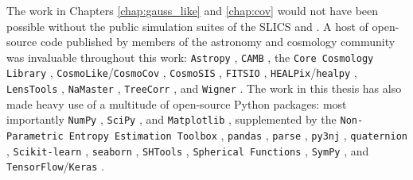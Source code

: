 The work in Chapters \ref{chap:gauss_like} and \ref{chap:cov} would not have been possible without the public simulation suites of the SLICS \citep{Harnois-Deraps2015, Harnois-Deraps2018} and \citet{Takahashi2017}. A host of open-source code published by members of the astronomy and cosmology community was invaluable throughout this work:
%
%
%
%
%
\texttt{Astropy} \citep{TheAstropyCollaboration2013, TheAstropyCollaboration2018},
\texttt{CAMB} \citep{Lewis2000, Howlett2012},
the \texttt{Core Cosmology Library} \citep{Chisari2019},
\texttt{CosmoLike}/\texttt{CosmoCov} \citep{Krause2017CosmoLike, Fang2020CosmoCov},
\texttt{CosmoSIS} \citep{Zuntz2015},
\texttt{FITSIO} \citep{Pence1999},
\texttt{HEALPix}/\texttt{healpy} \citep{Gorski2005, Zonca2019},
\texttt{LensTools} \citep{Petri2016},
\texttt{NaMaster} \citep{Alonso2019},
\texttt{TreeCorr} \citep{Jarvis2004TreeCorr},
and \texttt{Wigner} \citep{Tessore2019}.
The work in this thesis has also made heavy use of a multitude of open-source Python packages:
most importantly
\texttt{NumPy} \citep{Harris2020},
\texttt{SciPy} \citep{Virtanen2020},
and \texttt{Matplotlib} \citep{Hunter2007},
supplemented by
the \texttt{Non-Parametric Entropy Estimation Toolbox} \citep{VerSteeg2014},
\texttt{pandas} \citep{McKinney2010, Pandas2020},
\texttt{parse} \citep{Jones2021},
\texttt{py3nj} \citep{Fuji2021},
\texttt{quaternion} \citep{Boyle2022},
\texttt{Scikit-learn} \citep{Pedregosa2011},
\texttt{seaborn} \citep{Waskom2021},
\texttt{SHTools} \citep{Wieczorek2018},
\texttt{Spherical Functions} \citep{Boyle2021},
\texttt{SymPy} \citep{Meurer2017},
and \texttt{TensorFlow}/\texttt{Keras} \citep{Abadi2016, Chollet2015}.


